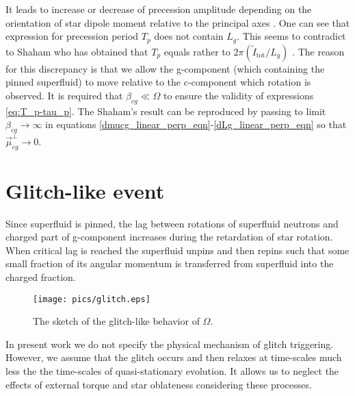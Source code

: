 \documentclass[a4paper]{jpconf}
\begin{document}
    It leads to increase or decrease of precession amplitude depending on the orientation of star dipole moment relative to the principal axes \cite{Goldreich1970}.
    One can see that expression for precession period $T_p$ does not contain $L_g$. This seems to contradict to Shaham who has obtained that $T_p$ equals rather to  $2\pi(\tilde{I}_\mathrm{tot}/L_g)$ \cite{Shaham1977}. The reason for this discrepancy is that we allow the g-component (which containing the pinned superfluid) to move relative to the c-component which rotation is observed. It is required that $\beta_{cg}\ll\Omega$ to ensure the validity of expressions \eqref{eq:T_p-tau_p}. The Shaham's result can be reproduced by passing to limit  $\beta_{cg}\rightarrow \infty$ in equations \eqref{dmucg_linear_perp_eqn}-\eqref{dLg_linear_perp_eqn} so that $\vec{\mu}_{cg}^{\perp}\rightarrow 0$.  

  \section{Glitch-like event}
    Since superfluid is pinned, the lag between rotations of superfluid neutrons and charged part of g-component increases during the retardation of star rotation. When critical lag is reached the superfluid unpins and then repins such that some small fraction of its angular momentum  is transferred from superfluid into the charged fraction. 
        \begin{wrapfigure}{r}{0.4\linewidth}
          \center
          \vspace{-1cm}
          \texttt{[image: pics/glitch.eps]}
          \caption{\label{fig:glitch}The sketch of the glitch-like behavior of $\Omega$.}        
    \end{wrapfigure}               
    In present work we do not specify the physical mechanism of glitch triggering. However, we assume that the glitch occurs and then relaxes at time-scales much less the the time-scales of quasi-stationary evolution. It allows us to neglect the effects of external torque and star oblateness considering these processes.
    
\end{document}
